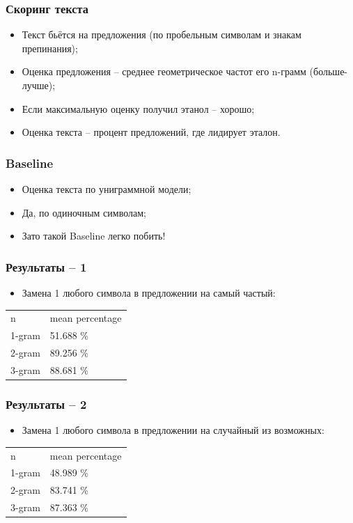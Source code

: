\documentclass[14pt]{beamer}
\begin{document}
\begin{frame}
\frametitle{Скоринг текста}
\begin{itemize}
    \item Текст бьётся на предложения (по пробельным символам и знакам препинания);
    \item Оценка предложения -- среднее геометрическое частот его n-грамм (больше-лучше);
    \item Если максимальную оценку получил этанол -- хорошо;
    \item Оценка текста -- процент предложений, где лидирует эталон.
\end{itemize}
\end{frame}

\begin{frame}
\frametitle{Baseline}
\begin{itemize}
    \item Оценка текста по униграммной модели;
    \item Да, по одиночным символам;
    \item Зато такой Baseline легко побить!
\end{itemize}
\end{frame}

\begin{frame}
\frametitle{Результаты -- 1}
\begin{itemize}
  \item Замена 1 любого символа в предложении на самый частый:
\end{itemize}
\begin{center}
\begin{tabular}{ll}
n & mean percentage \\
1-gram & 51.688 \% \\
2-gram & 89.256 \% \\
3-gram & 88.681 \%
\end{tabular}
\end{center}
\end{frame}

\begin{frame}
\frametitle{Результаты -- 2}
\begin{itemize}
  \item Замена 1 любого символа в предложении на случайный из возможных:
\end{itemize}
\begin{center}
\begin{tabular}{ll}
n & mean percentage \\
1-gram & 48.989 \% \\
2-gram & 83.741 \% \\
3-gram & 87.363 \%
\end{tabular}
\end{center}
\end{frame}
\end{document}
